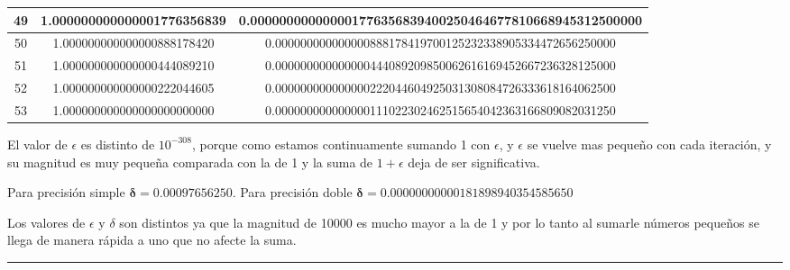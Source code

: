 \documentclass{article}
\begin{document}
\begin{itemize}
\begin{longtable}{|c||c|c|}
		49 & 1.000000000000001776356839 & 0.000000000000001776356839400250464677810668945312500000 \\ \hline 
		50 & 1.000000000000000888178420 & 0.000000000000000888178419700125232338905334472656250000 \\ \hline 
		51 & 1.000000000000000444089210 & 0.000000000000000444089209850062616169452667236328125000 \\ \hline 
		52 & 1.000000000000000222044605 & 0.000000000000000222044604925031308084726333618164062500 \\ \hline 
		53 & 1.000000000000000000000000 & 0.000000000000000111022302462515654042363166809082031250 \\ \hline 

	\end{longtable}
	
	El valor de $\epsilon$ es distinto de $10^{-308}$, porque como estamos continuamente sumando
	1 con $\epsilon$, y $\epsilon$ se vuelve mas pequeño con cada iteración, y su magnitud es muy pequeña
	comparada con la de 1 y la suma de $1 + \epsilon$ deja de ser significativa.
	
	Para precisión simple $\boldsymbol{\delta = 0.00097656250}$\newline.
	Para precisión doble $\boldsymbol{\delta = 0.00000000000181898940354585650}$
	
	Los valores de $\epsilon$ y $\delta$ son distintos ya que la magnitud de 10000 es mucho mayor a la de 1 y por lo tanto
	al sumarle números pequeños se llega de manera rápida a uno que no afecte la suma.
\end{itemize}


\hrule
\end{document}

